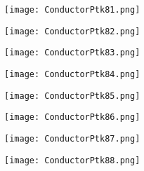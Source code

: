 \documentclass[pdf]{beamer}
\begin{document}
\begin{frame}
\begin{figure}[!h]
\centering
\texttt{[image: ConductorPtk81.png]}
\end{figure}
\end{frame}

\begin{frame}
\begin{figure}[!h]
\centering
\texttt{[image: ConductorPtk82.png]}
\end{figure}
\end{frame}

\begin{frame}
\begin{figure}[!h]
\centering
\texttt{[image: ConductorPtk83.png]}
\end{figure}
\end{frame}

\begin{frame}
\begin{figure}[!h]
\centering
\texttt{[image: ConductorPtk84.png]}
\end{figure}
\end{frame}

\begin{frame}
\begin{figure}[!h]
\centering
\texttt{[image: ConductorPtk85.png]}
\end{figure}
\end{frame}

\begin{frame}
\begin{figure}[!h]
\centering
\texttt{[image: ConductorPtk86.png]}
\end{figure}
\end{frame}

\begin{frame}
\begin{figure}[!h]
\centering
\texttt{[image: ConductorPtk87.png]}
\end{figure}
\end{frame}

\begin{frame}
\begin{figure}[!h]
\centering
\texttt{[image: ConductorPtk88.png]}
\end{figure}
\end{frame}
\end{document}
